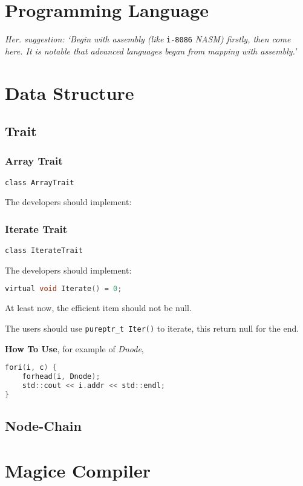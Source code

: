 
\section{Programming Language}

\textit{Her. suggestion: `Begin with assembly (like} \verb|i-8086| \textit{NASM) firstly, then come here. It is notable that advanced languages began from mapping with assembly.'}



\section{Data Structure}

\subsection{Trait}

\subsubsection{Array Trait}

\verb|class ArrayTrait|

The developers should implement:

\lstset{style=GlobalCxx}

\subsubsection{Iterate Trait}

\verb|class IterateTrait|

The developers should implement:

\lstset{style=GlobalC}
\begin{lstlisting}[language=C]
virtual void Iterate() = 0;
\end{lstlisting}

At least now, the efficient item should not be null.

The users should use \verb|pureptr_t Iter()| to iterate, this return null for the end.

\textbf{How To Use}, for example of \textit{Dnode},

\lstset{style=GlobalC}
\begin{lstlisting}[language=C]
fori(i, c) {
	forhead(i, Dnode);
	std::cout << i.addr << std::endl;
}
\end{lstlisting}

\subsection{Node-Chain}


\section{Magice Compiler}


